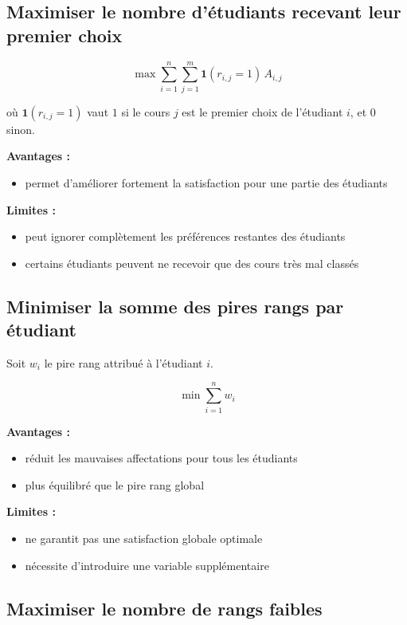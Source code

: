 \documentclass[11pt]{article}
\begin{document}
\subsection{Maximiser le nombre d'étudiants recevant leur premier choix}

\[
\max \sum_{i=1}^{n} \sum_{j=1}^{m} \mathbf{1}(r_{i,j} = 1)\, A_{i,j}
\]

où $\mathbf{1}(r_{i,j} = 1)$ vaut $1$ si le cours $j$ est le premier choix de l'étudiant $i$, et $0$ sinon.

\textbf{Avantages :}

\begin{itemize}
\item permet d'améliorer fortement la satisfaction pour une partie des étudiants
\end{itemize}

\textbf{Limites :}

\begin{itemize}
\item peut ignorer complètement les préférences restantes des étudiants
\item certains étudiants peuvent ne recevoir que des cours très mal classés
\end{itemize}

\subsection{Minimiser la somme des pires rangs par étudiant}

Soit $w_i$ le pire rang attribué à l'étudiant $i$.

\[
\min \sum_{i=1}^{n} w_i
\]

\textbf{Avantages :}

\begin{itemize}
\item réduit les mauvaises affectations pour tous les étudiants
\item plus équilibré que le pire rang global
\end{itemize}

\textbf{Limites :}

\begin{itemize}
\item ne garantit pas une satisfaction globale optimale
\item nécessite d'introduire une variable supplémentaire
\end{itemize}

\subsection{Maximiser le nombre de rangs faibles}
\end{document}
